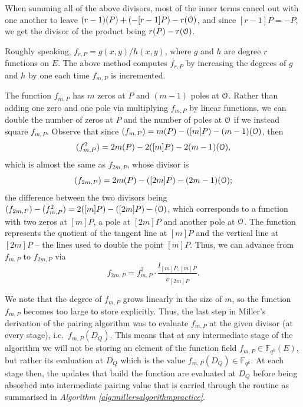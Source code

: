 When summing all of the above divisors, most of the inner terms cancel out with one another to leave $(r-1)(P) + (-[r-1]P) - r(\EuScript{O})$, and since $[r-1]P = -P$, we get the divisor of the product being $r(P) - r(\EuScript{O})$.

Roughly speaking, $f_{r,P} = g(x,y)/h(x,y)$, where $g$ and $h$ are degree $r$ functions on $E$. The above method computes $f_{r,P}$ by increasing the degrees of $g$ and $h$ by one each time $f_{m,P}$ is incremented. 


The function $f_{m,P}$ has $m$ zeros at $P$ and $(m-1)$ poles at $\EuScript{O}$. Rather than adding one zero and one pole via multiplying $f_{m,P}$ by linear functions, we can double the number of zeros at $P$ and the number of poles at $\EuScript{O}$ if we instead square $f_{m,P}$. Observe that since $(f_{m,P}) = m(P) - ([m]P) - (m-1)(\EuScript{O})$, then
\[
(f_{m,P}^2) = 2m(P) - 2([m]P) - 2(m-1)(\EuScript{O}),
\]
which is almost the same as $f_{2m,P}$, whose divisor is
\[
(f_{2m,P}) = 2m(P) - ([2m]P) - (2m-1)(\EuScript{O});
\]
the difference between the two divisors being $(f_{2m,P}) - (f_{m,P}^2) = 2([m]P) - ([2m]P) - (\EuScript{O})$, which corresponds to a function with two zeros at $[m]P$, a pole at $[2m]P$ and another pole at $\EuScript{O}$. The function represents the quotient of the tangent line at $[m]P$ and the vertical line at $[2m]P$ -- the lines used to double the point $[m]P$. Thus, we can advance from $f_{m,P}$ to $f_{2m,P}$ via
\[
f_{2m,P} = f_{m,P}^2 \cdot \frac{l_{[m]P,[m]P}}{v_{[2m]P}}.
\]

%

We note that the degree of $f_{m,P}$ grows linearly in the size of $m$, so the function $f_{m,P}$ becomes too large to store explicitly. Thus, the last step in Miller's derivation of the pairing algorithm was to evaluate $f_{m,P}$ at the given divisor (at every stage), i.e.\ $f_{m,P}(D_Q)$. This means that at any intermediate stage of the algorithm we will not be storing an element of the function field $f_{m,P} \in \mathbb{F}_{q^k}(E)$, but rather its evaluation at $D_Q$ which is the value $f_{m,P}(D_Q) \in \mathbb{F}_{q^k}$. At each stage then, the updates that build the function are evaluated at $D_Q$ before being absorbed into intermediate pairing value that is carried through the routine as summarised in \textit{Algorithm \ref{alg:millersalgorithmpractice}}.


